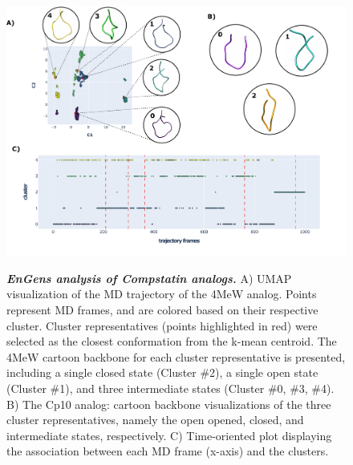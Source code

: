 \documentclass[numsec,webpdf,contemporary,large]{oup-authoring-template}
\theoremstyle{thmstyleone}%
\theoremstyle{thmstyletwo}%
\theoremstyle{thmstylethree}%
\begin{document}
\begin{figure}[!t]%
\centering
{\includegraphics[scale=0.2]{compstatin.pdf}}
\caption{\textbf{\textit{ EnGens analysis of Compstatin analogs.}} A) UMAP visualization of the MD trajectory of the 4MeW analog. Points represent MD frames, and are colored based on their respective cluster. Cluster representatives (points highlighted in red) were selected as the closest conformation from the k-mean centroid. The 4MeW cartoon backbone for each cluster representative is presented, including a single closed state (Cluster \#2), a single open state (Cluster \#1), and three intermediate states (Cluster \#0, \#3, \#4). B) The Cp10 analog: cartoon backbone visualizations of the three cluster representatives, namely the open opened, closed, and intermediate states, respectively. C) Time-oriented plot displaying the association between each MD frame (x-axis) and the clusters.}
\label{fig-res2}
\end{figure}
\end{document}
